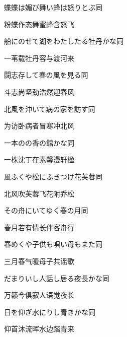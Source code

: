 \begin{haiku}
    {\FH 蝶蝶は媚び舞い蜂は怒りとぶ}\hfill{\FH 同}

    {\FK 粉蝶作态舞蜜蜂含怒飞}
\end{haiku}

\begin{haiku}
    {\FH 船にのせて湖をわたしたる牡丹かな}\hfill{\FH 同}

    {\FK 一苇载牡丹容与渡河来}
\end{haiku}

\begin{haiku}
    {\FH 闘志存して春の風を見る}\hfill{\FH 同}

    {\FK 斗志尚坚劲浩然迎春风}
\end{haiku}

\begin{haiku}
    {\FH 北風を沖いて病の家を訪す}\hfill{\FH 同}

    {\FK 为访卧病者冒寒冲北风}
\end{haiku}

\begin{haiku}
    {\FH 一本のの香の館かな}\hfill{\FH 同}

    {\FK 一株沈丁在素馨漫轩楹}
\end{haiku}

\begin{haiku}
    {\FH 風ふくや松にふきつけ花芙蓉}\hfill{\FH 同}

    {\FK 北风吹芙蓉飞花附乔松}
\end{haiku}

\begin{haiku}
    {\FH その舟にいてゆく春の月}\hfill{\FH 同}

    {\FK 春月若有情长伴客舟行}
\end{haiku}

\begin{haiku}
    {\FH 春めくや子供も唄い母もまた}\hfill{\FH 同}

    {\FK 三月春气暖母子共谣歌}
\end{haiku}

\begin{haiku}
    {\FH だまりいし人話し居る夜長かな}\hfill{\FH 同}

    {\FK 万籁今俱寂人语觉夜长}
\end{haiku}

\begin{haiku}
    {\FH 日を仰ぎ水にりし青きかな}\hfill{\FH 同}

    {\FK 仰首沐流晖水边踏青来}
\end{haiku}

